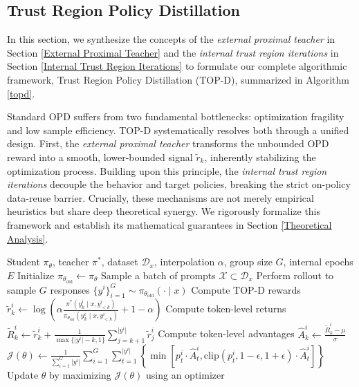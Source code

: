 \documentclass{article}
\theoremstyle{plain}
\theoremstyle{definition}
\theoremstyle{remark}
\begin{document}
\subsection{Trust Region Policy Distillation}\label{Trust Region Policy Distillation}
In this section, we synthesize the concepts of the \textit{external proximal teacher} in Section \ref{External Proximal Teacher} and the \textit{internal trust region iterations} in Section \ref{Internal Trust Region Iterations} to formulate our complete algorithmic framework, Trust Region Policy Distillation (TOP-D), summarized in Algorithm \ref{topd}.

Standard OPD suffers from two fundamental bottlenecks: optimization fragility and low sample efficiency. TOP-D systematically resolves both through a unified design. First, the \textit{external proximal teacher} transforms the unbounded OPD reward into a smooth, lower-bounded signal $\tilde{r}_k$, inherently stabilizing the optimization process. Building upon this principle, the \textit{internal trust region iterations} decouple the behavior and target policies, breaking the strict on-policy data-reuse barrier. Crucially, these mechanisms are not merely empirical heuristics but share deep theoretical synergy. We rigorously formalize this framework and establish its mathematical guarantees in Section \ref{Theoretical Analysis}.

\begin{algorithm}[!t]
	\caption{Trust Region Policy Distillation (TOP-D)}
	\label{topd}
	\begin{algorithmic}[1]
		\REQUIRE Student $\pi_{\theta}$, teacher $\pi^*$, dataset $\mathcal{D}_x$, interpolation $\alpha$, group size $G$, internal epochs $E$
		\STATE Initialize $\pi_{\theta_{\mathrm{old}}} \leftarrow \pi_{\theta}$
		\STATE Sample a batch of prompts $\mathcal{X}\subset\mathcal{D}_x$
		\STATE Perform rollout to sample $G$ responses $\{y^{i}\}_{i=1}^{G}\sim\pi_{\theta_{\mathrm{old}}}(\cdot\mid x)$
		\STATE Compute TOP-D rewards $\tilde{r}_k^i\leftarrow\log\left(\alpha\frac{\pi^*(y_k^i\mid x,y_{<k}^i)}{\pi_{\theta_{\mathrm{old}}}(y_k^i\mid x,y_{<k}^i)}+1-\alpha\right)$
		\STATE Compute token-level returns $\tilde{R}_k^i\leftarrow\tilde{r}_k^i+\frac{1}{\max\{\lvert y^i\rvert-k,1\}}\sum_{j=k+1}^{\lvert y^i\rvert}\tilde{r}_j^i$
		\STATE Compute token-level advantages $\hat{A}_k^i\leftarrow\frac{\tilde{R}_k^i-\mu}{\sigma}$
		\ENDFOR
		\STATE $\mathcal{J}(\theta)\leftarrow\frac{1}{\sum_{i=1}^{G}\lvert y^{i}\rvert}\sum_{i=1}^{G}\sum_{t=1}^{\lvert y^{i}\rvert}\left\{\min\left[p_t^i\cdot\hat{A}_t^i,\mathrm{clip}\left(p_t^i,1-\epsilon,1+\epsilon\right)\cdot\hat{A}_t^i\right]\right\}$
		\STATE Update $\theta$ by maximizing $\mathcal{J}(\theta)$ using an optimizer
		\ENDFOR
		\ENDWHILE
	\end{algorithmic}
\end{algorithm}
\end{document}
